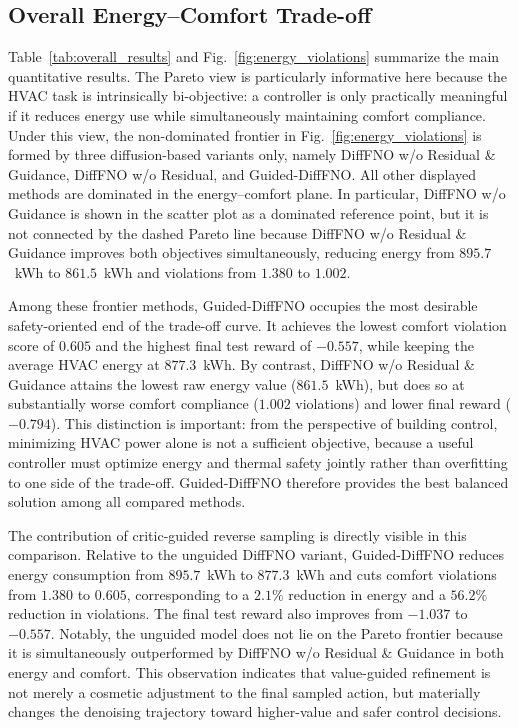 \subsection{Overall Energy--Comfort Trade-off}

Table~\ref{tab:overall_results} and Fig.~\ref{fig:energy_violations} summarize the main quantitative results. The Pareto view is particularly informative here because the HVAC task is intrinsically bi-objective: a controller is only practically meaningful if it reduces energy use while simultaneously maintaining comfort compliance. Under this view, the non-dominated frontier in Fig.~\ref{fig:energy_violations} is formed by three diffusion-based variants only, namely DiffFNO w/o Residual \& Guidance, DiffFNO w/o Residual, and Guided-DiffFNO. All other displayed methods are dominated in the energy--comfort plane. In particular, DiffFNO w/o Guidance is shown in the scatter plot as a dominated reference point, but it is not connected by the dashed Pareto line because DiffFNO w/o Residual \& Guidance improves both objectives simultaneously, reducing energy from $895.7$~kWh to $861.5$~kWh and violations from $1.380$ to $1.002$.

Among these frontier methods, Guided-DiffFNO occupies the most desirable safety-oriented end of the trade-off curve. It achieves the lowest comfort violation score of $0.605$ and the highest final test reward of $-0.557$, while keeping the average HVAC energy at $877.3$~kWh. By contrast, DiffFNO w/o Residual \& Guidance attains the lowest raw energy value ($861.5$~kWh), but does so at substantially worse comfort compliance ($1.002$ violations) and lower final reward ($-0.794$). This distinction is important: from the perspective of building control, minimizing HVAC power alone is not a sufficient objective, because a useful controller must optimize energy and thermal safety jointly rather than overfitting to one side of the trade-off. Guided-DiffFNO therefore provides the best balanced solution among all compared methods.

The contribution of critic-guided reverse sampling is directly visible in this comparison. Relative to the unguided DiffFNO variant, Guided-DiffFNO reduces energy consumption from $895.7$~kWh to $877.3$~kWh and cuts comfort violations from $1.380$ to $0.605$, corresponding to a $2.1\%$ reduction in energy and a $56.2\%$ reduction in violations. The final test reward also improves from $-1.037$ to $-0.557$. Notably, the unguided model does not lie on the Pareto frontier because it is simultaneously outperformed by DiffFNO w/o Residual \& Guidance in both energy and comfort. This observation indicates that value-guided refinement is not merely a cosmetic adjustment to the final sampled action, but materially changes the denoising trajectory toward higher-value and safer control decisions.


